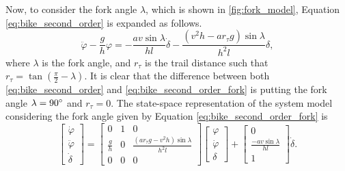 	Now, to consider the fork angle $\lambda$, which is shown in \autoref{fig:fork_model}, Equation \eqref{eq:bike_second_order} is expanded as follows.
		\begin{equation}
		\label{eq:bike_second_order_fork}
		\ddot{\varphi} - \frac{g}{h} \varphi = - \frac{av \sin \lambda}{hl} \dot{\delta} - \frac{\left(v^2 h - ar_\tau g \right) \sin \lambda}{h^2 l} \delta,
	\end{equation}
		where $\lambda$ is the fork angle, and $r_\tau$ is the trail distance such that $r_\tau = \tan(\frac{\pi}{2} - \lambda) $.
	It is clear that the difference between both \eqref{eq:bike_second_order} and \eqref{eq:bike_second_order_fork} is putting the fork angle $\lambda = 90\degree$ and $r_{\tau} = 0$.
	The state-space representation of the system model considering the fork angle given by Equation \ref{eq:bike_second_order_fork} is
	\begin{equation}
		\label{eq:bike_state_equation}
		\begin{bmatrix}
			\dot{\varphi} \\
			\ddot{\varphi} \\
			\dot{\delta}
		\end{bmatrix}
		=
		\begin{bmatrix}
			0 & 1 & 0 \\
			\frac{g}{h} & 0 & \frac{\left(a r_\tau g - v^2 h \right) \sin \lambda}{h^2 l} \\
			0 & 0 & 0
		\end{bmatrix}
		\begin{bmatrix}
			\varphi \\
			\dot{\varphi} \\
			\delta
		\end{bmatrix}
		+
		\begin{bmatrix}
			0 \\
			\frac{- a v \sin \lambda}{h l} \\
			1
		\end{bmatrix}
		\dot{\delta}.
	\end{equation}

